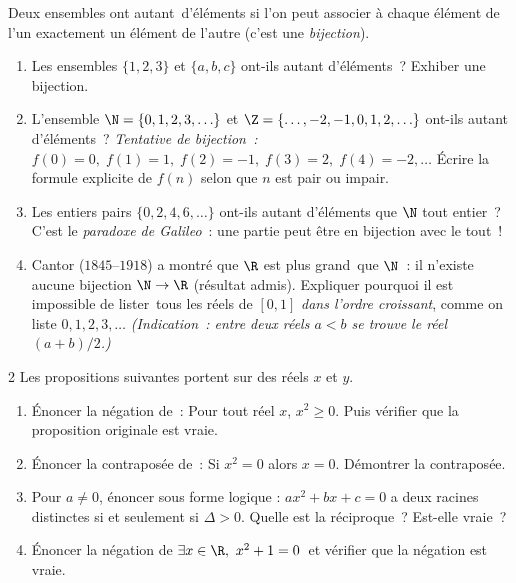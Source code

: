 \begin{challenge}
Deux ensembles ont \og autant\fg\ d'\'el\'ements si l'on peut associer
\`a chaque \'el\'ement de l'un exactement un \'el\'ement de l'autre
(c'est une \emph{bijection}).
\begin{enumerate}
  \item Les ensembles $\{1,2,3\}$ et $\{a,b,c\}$ ont-ils autant
        d'\'el\'ements~? Exhiber une bijection.
  \item L'ensemble $\N = \{0,1,2,3,\ldots\}$ et
        $\Z = \{\ldots,-2,-1,0,1,2,\ldots\}$
        ont-ils autant d'\'el\'ements~?
        \emph{Tentative de bijection~:}
        $f(0)=0,\; f(1)=1,\; f(2)=-1,\; f(3)=2,\; f(4)=-2,\ldots$
        \'Ecrire la formule explicite de $f(n)$ selon que $n$ est pair ou impair.
  \item Les entiers pairs $\{0,2,4,6,\ldots\}$ ont-ils autant d'\'el\'ements
        que $\N$ tout entier~?
        C'est le \emph{paradoxe de Galileo}~: une partie peut \^etre
        en bijection avec le tout~!
  \item Cantor ($1845$--$1918$) a montr\'e que $\R$ est \og plus grand\fg\ que $\N$~:
        il n'existe aucune bijection $\N\to\R$ (r\'esultat admis).
        Expliquer pourquoi il est impossible de \og lister\fg\ tous les r\'eels
        de $[0,1]$ \emph{dans l'ordre croissant}, comme on liste $0,1,2,3,\ldots$
        \emph{(Indication~: entre deux r\'eels $a<b$ se trouve le r\'eel $(a+b)/2$.)}
\end{enumerate}
\end{challenge}

\begin{probleme}{2}
Les propositions suivantes portent sur des r\'eels $x$ et $y$.
\begin{enumerate}
  \item \'Enoncer la n\'egation de~:
        \og Pour tout r\'eel $x$, $x^2 \geq 0$.\fg
        Puis v\'erifier que la proposition originale est vraie.
  \item \'Enoncer la contrapos\'ee de~:
        \og Si $x^2 = 0$ alors $x = 0$.\fg
        D\'emontrer la contrapos\'ee.
  \item Pour $a\ne0$, \'enoncer sous forme logique :
        \og $ax^2+bx+c=0$ a deux racines distinctes si et seulement si
        $\Delta > 0$.\fg
        Quelle est la r\'eciproque~? Est-elle vraie~?
  \item \'Enoncer la n\'egation de \og $\exists x\in\R,\ x^2+1=0$\fg\ et
        v\'erifier que la n\'egation est vraie.
\end{enumerate}
\end{probleme}


